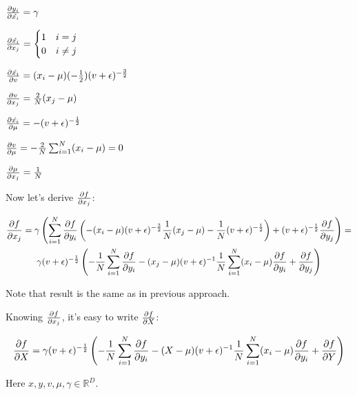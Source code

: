 \documentclass[12pt]{article}
\begin{document}
$\pdv{y_i}{\hat{x_i}} = \gamma$

$
\pdv{\hat{x_i}}{x_j} = 
\begin{cases}
1 & \text{$i = j$} \\
0 & \text{$i \ne j$}
\end{cases}
$

$\pdv{\hat{x_i}}{v} = (x_i - \mu) (- \frac{1}{2}) (v + \epsilon)^{-\frac{3}{2}}$

$\pdv{v}{x_j} = \frac{2}{N} (x_j - \mu)$

$\pdv{\hat{x_i}}{\mu} = - (v + \epsilon)^{-\frac{1}{2}}$

$\pdv{v}{\mu} = - \frac{2}{N} \sum_{i=1}^{N} (x_i - \mu) = 0$

$\pdv{\mu}{x_j} = \frac{1}{N}$

Now let's derive $\pdv{f}{x_j}$:

\begin{gather*}
\pdv{f}{x_j} = 
	\gamma 
	\left(
		\sum_{i=1}^{N} \pdv{f}{y_i} 
			\left( 
				- (x_i - \mu) (v + \epsilon)^{-\frac{3}{2}} \frac{1}{N} (x_j - \mu) - \frac{1}{N} (v + \epsilon)^{-\frac{1}{2}}
			\right) 
			+ (v + \epsilon)^{-\frac{1}{2}} \pdv{f}{y_j}
	\right) = \\
	\gamma (v + \epsilon)^{-\frac{1}{2}} 
	\left(	
		- \frac{1}{N} \sum_{i=1}^{N} \pdv{f}{y_i}
		- (x_j - \mu) (v + \epsilon)^{-1} \frac{1}{N} \sum_{i=1}^{N} (x_i - \mu) \pdv{f}{y_i} 
		+ \pdv{f}{y_j}
	\right)
\end{gather*}

Note that result is the same as in previous approach.

Knowing $\pdv{f}{x_j}$, it's easy to write $\pdv{f}{X}$:

\[
	\pdv{f}{X} = \gamma (v + \epsilon)^{-\frac{1}{2}} \left( -\frac{1}{N} \sum_{i=1}^{N} \pdv{f}{y_i} - (X - \mu) (v + \epsilon)^{-1} \frac{1}{N} \sum_{i=1}^{N} (x_i - \mu) \pdv{f}{y_i} + \pdv{f}{Y} \right) 
\]

Here $x, y, v, \mu, \gamma \in \mathbb{R}^D$.
\end{document}
